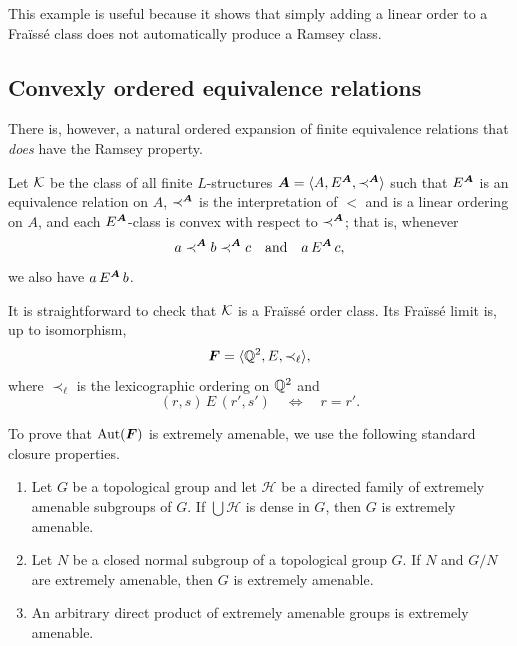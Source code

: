 This example is useful because it shows that simply adding a linear order to a Fraïssé class does not automatically produce a Ramsey class.

\subsection{Convexly ordered equivalence relations}

There is, however, a natural ordered expansion of finite equivalence relations that \emph{does} have the Ramsey property.

Let \(\mathcal{K}\) be the class of all finite \(L\)-structures
\(\boldsymbol{A}=\langle A,E^{\boldsymbol{A}},\prec^{\boldsymbol{A}}\rangle\) such that \(E^{\boldsymbol{A}}\) is an
equivalence relation on \(A\), \(\prec^{\boldsymbol{A}}\) is the interpretation of \(<\) and is a linear ordering on \(A\), and
each \(E^{\boldsymbol{A}}\)-class is convex with respect to \(\prec^{\boldsymbol{A}}\); that is,
whenever
\[
    a\prec^{\boldsymbol{A}} b\prec^{\boldsymbol{A}} c
    \quad\text{and}\quad
    a\,E^{\boldsymbol{A}}\,c,
\]
we also have \(a\,E^{\boldsymbol{A}}\,b\).

It is straightforward to check that \(\mathcal{K}\) is a Fraïssé order class. Its Fraïssé limit is, up to isomorphism,
\[
    \boldsymbol{F}=\langle \mathbb{Q}^2,E,\prec_{\ell}\rangle,
\]
where \(\prec_{\ell}\) is the lexicographic ordering on \(\mathbb{Q}^2\) and
\[
    (r,s)\,E\,(r',s')
    \quad\Longleftrightarrow\quad
    r=r'.
\]

To prove that \(\operatorname{Aut}(\boldsymbol{F})\) is extremely amenable, we use the following standard closure properties.

\begin{lemma}
    \label{lem:ea-closure-properties}
    \leavevmode
    \begin{enumerate}
        \item[(i)] Let \(G\) be a topological group and let \(\mathcal{H}\) be a directed family of extremely amenable subgroups of \(G\). If \(\bigcup \mathcal{H}\) is dense in \(G\), then \(G\) is extremely amenable.
        \item[(ii)] Let \(N\) be a closed normal subgroup of a topological group \(G\). If \(N\) and \(G/N\) are extremely amenable, then \(G\) is extremely amenable.
        \item[(iii)] An arbitrary direct product of extremely amenable groups is extremely amenable.
    \end{enumerate}
\end{lemma}

